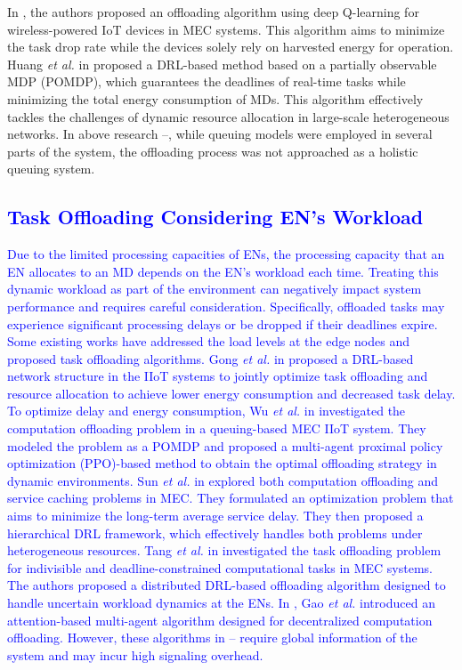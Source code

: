 \documentclass[10pt, journal,letterpaper]{IEEEtran}
\begin{document}
{	In \cite{Bolourian-WCL24}, the authors proposed an offloading algorithm using deep Q-learning for wireless-powered IoT devices in MEC systems. This algorithm aims to minimize the task drop rate while the devices solely rely on harvested energy for operation. 
	 Huang \textit{et al.} in \cite{huang2021deadline} proposed a DRL-based method based on a partially observable MDP (POMDP), which guarantees the deadlines of real-time tasks while minimizing the total energy consumption of MDs. This algorithm effectively tackles the challenges of dynamic resource allocation in large-scale heterogeneous networks.
	 In above research \cite{munir2021multi}--\cite{huang2021deadline}, while queuing models were employed in several parts of the system, the offloading process was not approached as a holistic queuing system. }
	 



 \textcolor{blue}{\subsection{Task Offloading Considering EN's Workload}
Due to the limited processing capacities of ENs, the processing capacity that an EN allocates to an MD depends on the EN's workload each time. Treating this dynamic workload as part of the environment can negatively impact system performance and requires careful consideration. Specifically, offloaded tasks may experience significant processing delays or be dropped if their deadlines expire. Some existing works have addressed the load levels at the edge nodes and proposed task offloading algorithms.
Gong \textit{et al.} in \cite{gong2022edge} proposed a DRL-based network structure in the IIoT systems to jointly optimize task offloading and resource allocation to achieve lower energy consumption and decreased task delay.
To optimize delay and energy consumption, Wu \textit{et al.} in \cite{wu2023multi} investigated the computation offloading problem in a queuing-based MEC IIoT system. They modeled the problem as a POMDP and proposed a multi-agent proximal policy optimization (PPO)-based method to obtain the optimal offloading strategy in dynamic environments.
Sun \textit{et al.} in \cite{sun2024hierarchical} explored both computation offloading and service caching problems in MEC. They formulated an optimization problem that aims to minimize the long-term average service delay. They then proposed a hierarchical DRL framework, which effectively handles both problems under heterogeneous resources.
Tang \textit{et al.} in \cite{9253665} investigated the task offloading problem for indivisible and deadline-constrained computational tasks in MEC systems. The authors proposed a distributed DRL-based offloading algorithm designed to handle uncertain workload dynamics at the ENs. 
 In \cite{gao2022large}, Gao \textit{et al.} introduced an attention-based multi-agent algorithm designed for decentralized computation offloading.
However, these algorithms in \cite{gong2022edge}–\cite{gao2022large} require global information of the system and may incur high signaling overhead.}
\end{document}
